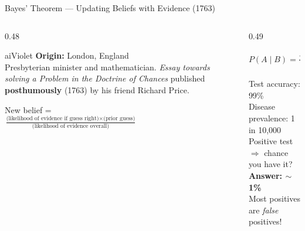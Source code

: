 \begin{frame}[shrink=25]{Bayes' Theorem --- Updating Beliefs with Evidence (1763)}

  \begin{columns}[T]
    \begin{column}{0.48\textwidth}
      \begin{personbox}{aiViolet}
        \textbf{Origin:} London, England\\[3pt]
        Presbyterian minister and mathematician.
        \emph{Essay towards solving a Problem in the Doctrine of Chances}
        published \textbf{posthumously} (1763) by his friend Richard
        Price.
      \end{personbox}

      \vspace{0.4em}
      \begin{tcolorbox}[colback=aiViolet!5, colframe=aiViolet!60,
        fonttitle=\bfseries\small, title={Recipe: Updating Beliefs},
        rounded corners, boxrule=0.5pt, left=3pt, right=3pt, top=2pt, bottom=2pt]
        \footnotesize
        New belief =\\[2pt]
        \(\frac{\text{(likelihood of evidence if guess right)}
          \times \text{(prior guess)}}
          {\text{(likelihood of evidence overall)}}\)
      \end{tcolorbox}
    \end{column}

    \begin{column}{0.49\textwidth}
      \begin{tcolorbox}[colback=gray!5, colframe=gray!40,
        fonttitle=\bfseries\small, title={Formal},
        rounded corners, boxrule=0.5pt, left=3pt, right=3pt, top=2pt, bottom=2pt]
        \[
          P(A \mid B) = \frac{P(B \mid A)\; P(A)}{P(B)}
        \]
      \end{tcolorbox}

      \vspace{0.3em}
      \begin{tcolorbox}[colback=accentOrange!5, colframe=accentOrange!60,
        fonttitle=\bfseries\small, title={Surprise Example},
        rounded corners, boxrule=0.5pt, left=3pt, right=3pt, top=2pt, bottom=2pt]
        \footnotesize
        Test accuracy: 99\%\\
        Disease prevalence: 1 in 10,000\\
        Positive test \(\Rightarrow\) chance you have it?\\[3pt]
        \textbf{Answer: \(\sim\)1\%}\\
        Most positives are \emph{false} positives!
      \end{tcolorbox}


\end{column}
\end{columns}
\end{frame}
